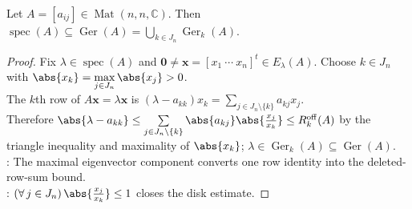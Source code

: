 \begin{theorem} \label{thm:gersgorin-disk-theorem} \\
Let $A=[a_{ij}]\in\operatorname{Mat}(n,n,\mathbb{C})$. Then $\operatorname{spec}(A)\subseteq\operatorname{Ger}(A)=\bigcup\limits_{k\in J_n}\operatorname{Ger}_k(A)$.
\begin{proof}
Fix $\lambda\in\operatorname{spec}(A)$ and $\mathbf{0}\neq\mathbf{x}=[x_1\ \cdots\ x_n]^t\in E_{\lambda}(A)$. Choose $k\in J_n$ with $\abs{x_k}=\max\limits_{j\in J_n}\abs{x_j}>0$.\\
The $k$th row of $A\mathbf{x}=\lambda\mathbf{x}$ is $(\lambda-a_{kk})x_k=\sum\limits_{j\in J_n\setminus\{k\}}a_{kj}x_j$.\\
Therefore $\abs{\lambda-a_{kk}}\leq\sum\limits_{j\in J_n\setminus\{k\}}\abs{a_{kj}}\abs{\frac{x_j}{x_k}}\leq R_k^{\mathrm{off}}(A)$ by the triangle inequality and maximality of $\abs{x_k}$;  $\lambda\in\operatorname{Ger}_k(A)\subseteq\operatorname{Ger}(A)$.\\
: The maximal eigenvector component converts one row identity into the deleted-row-sum bound.\\
: $(\forall\,j\in J_n)\,\abs{\frac{x_j}{x_k}}\leq1$ closes the disk estimate.
\end{proof}
\end{theorem}

